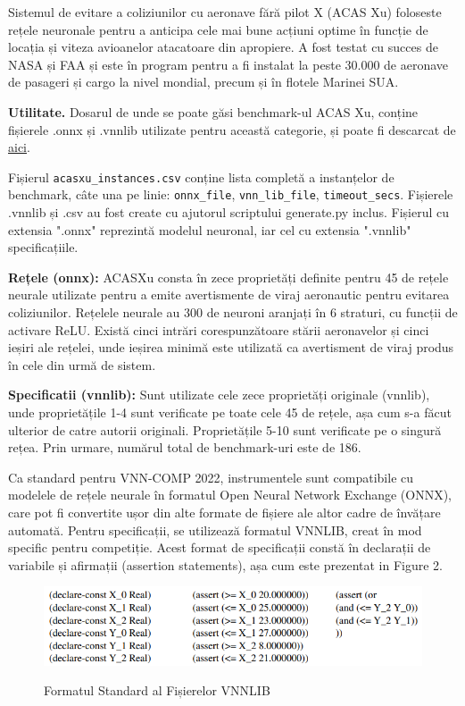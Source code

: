 \documentclass[12pt,a4paper]{article}
\theoremstyle{definition}
\theoremstyle{remark}
\begin{document}
Sistemul de evitare a coliziunilor cu aeronave fără pilot X (ACAS Xu) foloseste rețele neuronale pentru a anticipa cele mai bune acțiuni optime în funcție de locația și viteza avioanelor atacatoare din apropiere. A fost testat cu succes de NASA și FAA și este în program pentru a fi instalat la peste 30.000 de aeronave de pasageri și cargo la nivel mondial, precum și în flotele Marinei SUA. \cite{initial_separation}\par
{\bf Utilitate.} Dosarul de unde se poate găsi benchmark-ul ACAS Xu, conține fișierele .onnx și .vnnlib utilizate pentru această categorie, și poate fi descarcat de \href{https://github.com/ChristopherBrix/vnncomp2023_benchmarks/tree/main/benchmarks/acasxu}{aici}.  \par
Fișierul \texttt{acasxu\_instances.csv} conține lista completă a instanțelor de benchmark, câte una pe linie: \texttt{onnx\_file}, \texttt{vnn\_lib\_file},  \texttt{timeout\_secs}. Fișierele .vnnlib și .csv au fost create cu ajutorul scriptului generate.py inclus. Fișierul cu extensia ".onnx" reprezintă modelul neuronal, iar cel cu extensia ".vnnlib" specificațiile. \par
{\bf Rețele (onnx):} ACASXu consta în zece proprietăți definite pentru 45 de rețele neurale utilizate pentru a emite avertismente de viraj aeronautic pentru evitarea coliziunilor. Rețelele neurale au 300 de neuroni aranjați în 6 straturi, cu funcții de activare ReLU. Există cinci intrări corespunzătoare stării aeronavelor și cinci ieșiri ale rețelei, unde ieșirea minimă este utilizată ca avertisment de viraj produs în cele din urmă de sistem.\par
{\bf Specificatii (vnnlib):} Sunt utilizate cele zece proprietăți originale (vnnlib), unde proprietățile 1-4 sunt verificate pe toate cele 45 de rețele, așa cum s-a făcut ulterior de catre autorii originali. Proprietățile 5-10 sunt verificate pe o singură rețea. Prin urmare, numărul total de benchmark-uri este de 186.\par
Ca standard pentru VNN-COMP 2022, instrumentele sunt compatibile cu modelele de rețele neurale în formatul Open Neural Network Exchange (ONNX), care pot fi convertite ușor din alte formate de fișiere ale altor cadre de învățare automată. Pentru specificații, se utilizează formatul VNNLIB, creat în mod specific pentru competiție. Acest format de specificații constă în declarații de variabile și afirmații (assertion statements), așa cum este prezentat in Figure 2.\par
\begin{figure}[h!]
  \centering
    \includegraphics[width=.8\textwidth]{standard.png}
    \caption{Formatul Standard al Fișierelor VNNLIB}
    \cite{format}
\end{figure}
\end{document}
